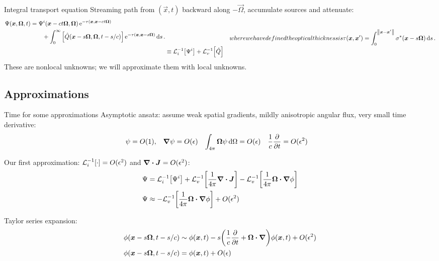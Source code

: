 \documentclass{beamer}
\begin{document}
\begin{frame}{Integral transport equation}
  Streaming path from $(\vec{x}, t)$ backward along $-\vec{\Omega}$, accumulate
  sources and attenuate:
\begin{subequations} \label{eqs:inverseTransport}
  \begin{align} \label{eq:inverseTransportFull}
  \begin{split}
    \Psi(\vec{x}, \vec{\Omega}, t)
    &= \Psi^i( \vec{x} - ct \vec{\Omega}, \vec{\Omega})
    \eexp^{ -\tau(\vec{x}, \vec{x} - ct \vec{\Omega})}
    \\
    &\qquad + \int_{0}^{\infty}
    \left[ \hat Q(\vec{x} - s \vec{\Omega}, \vec{\Omega}, t-s/c)
    \right]
    \eexp^{ -\tau(\vec{x}, \vec{x} - s \vec{\Omega})}
    \ud s\,.
  \end{split}
    \\ 
    &\equiv \lopinv{i}{\Psi^i}
    + \lopinv{v}{\hat Q} 
  \end{align}
  where we have defined the optical thickness is 
  \begin{equation} \label{eq:fullTauDefinition}
    \tau(\vec{x}, \vec{x}') = \int_{0}^{\norm{\vec{x} -
    \vec{x}'}} \sigma^\ast(\vec{x}-s\vec{\Omega}) \ud s \,.
  \end{equation}
\end{subequations}
These are nonlocal unknowns; we will approximate them with local unknowns.
\end{frame}

\subsection{Approximations}
\begin{frame}{Time for some approximations}
  Asymptotic ansatz: assume weak spatial gradients, mildly anisotropic angular flux, very small time
  derivative:
\begin{align*}
  \psi &= O(1), &
  \bm{\nabla} \psi &= O(\epsilon)&
  \int_{4\pi} \bm{\Omega} \psi\mathop{}\!\mathrm{d}\Omega &= O(\epsilon)&
  \frac{1}{c} \frac{\partial }{\partial t} &= O(\epsilon^2)
\end{align*}

Our first approximation: $\mathcal{L}_{i}^{-1}\!\left[\cdot\right] = O(\epsilon^2)$ and $\bm{\nabla} \bm{\cdot} \bm{J} =
O(\epsilon^2)$:
\begin{align*}
  \Psi &=
  \mathcal{L}_{i}^{-1}\!\left[\Psi^i\right]
  + \mathcal{L}_{v}^{-1}\!\left[\frac{1}{4\pi} \bm{\nabla} \bm{\cdot}\bm{J}\right] -
  \mathcal{L}_{v}^{-1}\!\left[\frac{1}{4\pi} \bm{\Omega}\bm{\cdot} \bm{\nabla} \phi\right]
    \\ 
  \Psi 
  &\approx
  - \mathcal{L}_{v}^{-1}\!\left[\frac{1}{4\pi} \bm{\Omega}\bm{\cdot} \bm{\nabla} \phi\right]
  + O(\epsilon^2)
\end{align*}

Taylor series expansion:
\begin{align} \nonumber
  \phi(\bm{x} - s\bm{\Omega}, t - s/c)
  &\sim \phi(\bm{x}, t)
  - s \bigg( \frac{1}{c} \frac{\partial }{\partial t} + \bm{\Omega} \bm{\cdot} \bm{\nabla} \bigg)
  \phi(\bm{x}, t) + O(\epsilon^2)
\\ \label{eq:taylorPhi}
\phi(\bm{x} - s\bm{\Omega}, t - s/c)
&= \phi(\bm{x}, t) + O(\epsilon)
\end{align}
\end{frame}
\end{document}
